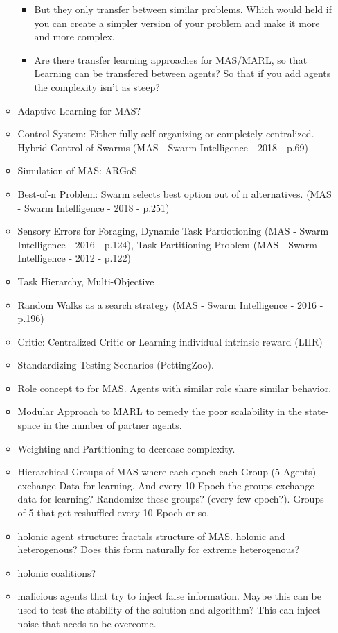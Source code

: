 \begin{itemize}
\begin{itemize}[noitemsep,nolistsep]
\begin{itemize}[noitemsep,nolistsep]
			\item But they only transfer between similar problems. Which would held if you can create a simpler version of your problem and make it more and more complex.
			\item Are there transfer learning approaches for MAS/MARL, so that Learning can be transfered between agents? So that if you add agents the complexity isn't as steep?
		\end{itemize}
		\item Adaptive Learning for MAS?
		\item Control System: Either fully self-organizing or completely centralized. Hybrid Control of Swarms (MAS - Swarm Intelligence - 2018 - p.69)
		\item Simulation of MAS: ARGoS
		\item Best-of-n Problem: Swarm selects best option out of n alternatives. (MAS - Swarm Intelligence - 2018 - p.251)
		\item Sensory Errors for Foraging, Dynamic Task Partiotioning (MAS - Swarm Intelligence - 2016 - p.124), Task Partitioning Problem (MAS - Swarm Intelligence - 2012 - p.122)
		\item Task Hierarchy, Multi-Objective
		\item Random Walks as a search strategy (MAS - Swarm Intelligence - 2016 - p.196)
		\item Critic: Centralized Critic or Learning individual intrinsic reward (LIIR)
		\item Standardizing Testing Scenarios (PettingZoo).
		\item Role concept to for MAS. Agents with similar role share similar behavior.
		\item Modular Approach to MARL to remedy the poor scalability in the state-space in the number of partner agents.
		\item Weighting and Partitioning to decrease complexity.
		\item Hierarchical Groups of MAS where each epoch each Group (5 Agents) exchange Data for learning. And every 10 Epoch the groups exchange data for learning? Randomize these groups? (every few epoch?). Groups of 5 that get reshuffled every 10 Epoch or so.
		\item holonic agent structure: fractals structure of MAS. holonic and heterogenous? Does this form naturally for extreme heterogenous?
		\item holonic coalitions?
		\item malicious agents that try to inject false information. Maybe this can be used to test the stability of the solution and algorithm? This can inject noise that needs to be overcome.

\end{itemize}
\end{itemize}

